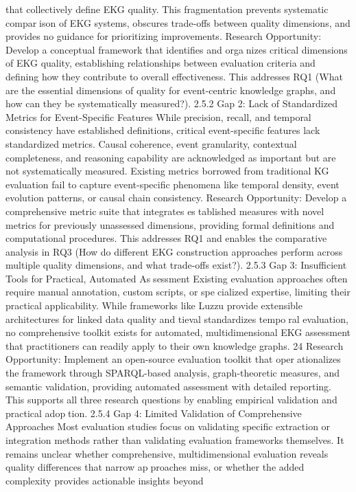that collectively define EKG quality. This fragmentation prevents systematic comparison of EKG systems, obscures trade-offs between quality dimensions, and provides no
guidance for prioritizing improvements.
Research Opportunity: Develop a conceptual framework that identifies and organizes critical dimensions of EKG quality, establishing relationships between evaluation
criteria and defining how they contribute to overall effectiveness. This addresses RQ1
(What are the essential dimensions of quality for event-centric knowledge graphs, and
how can they be systematically measured?).
2.5.2 Gap 2: Lack of Standardized Metrics for Event-Specific
Features
While precision, recall, and temporal consistency have established definitions, critical
event-specific features lack standardized metrics. Causal coherence, event granularity,
contextual completeness, and reasoning capability are acknowledged as important but are
not systematically measured. Existing metrics borrowed from traditional KG evaluation
fail to capture event-specific phenomena like temporal density, event evolution patterns,
or causal chain consistency.
Research Opportunity: Develop a comprehensive metric suite that integrates established measures with novel metrics for previously unassessed dimensions, providing
formal definitions and computational procedures. This addresses RQ1 and enables the
comparative analysis in RQ3 (How do different EKG construction approaches perform
across multiple quality dimensions, and what trade-offs exist?).
2.5.3 Gap 3: Insufficient Tools for Practical, Automated Assessment
Existing evaluation approaches often require manual annotation, custom scripts, or specialized expertise, limiting their practical applicability. While frameworks like Luzzu
provide extensible architectures for linked data quality and tieval standardizes temporal evaluation, no comprehensive toolkit exists for automated, multidimensional EKG
assessment that practitioners can readily apply to their own knowledge graphs.
24
Research Opportunity: Implement an open-source evaluation toolkit that operationalizes the framework through SPARQL-based analysis, graph-theoretic measures,
and semantic validation, providing automated assessment with detailed reporting. This
supports all three research questions by enabling empirical validation and practical adoption.
2.5.4 Gap 4: Limited Validation of Comprehensive Approaches
Most evaluation studies focus on validating specific extraction or integration methods
rather than validating evaluation frameworks themselves. It remains unclear whether
comprehensive, multidimensional evaluation reveals quality differences that narrow approaches miss, or whether the added complexity provides actionable insights beyond
